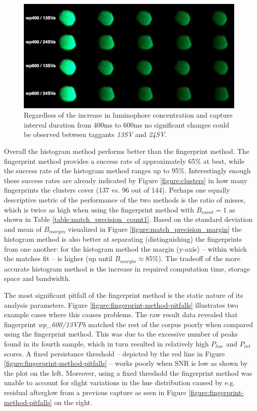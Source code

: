 \documentclass[thesis.tex]{subfiles}
\begin{document}
\begin{figure}[h!]
  \centering \includegraphics[page=1,width=\textwidth]{images/findings/SV}
  \caption{Regardless of the increase in luminophore concentration and capture interval duration from 400ms to 600ms no significant changes could be observed between taggants \emph{13SV} and \emph{24SV}.}
  \label{figure:SV}
\end{figure}

Overall the histogram method performs better than the fingerprint method. The fingerprint method provides a success rate of approximately 65\% at best, while the success rate of the histogram method ranges up to 95\%. Interestingly enough these success rates are already indicated by Figure \ref{figure:clusters} in how many fingerprints the clusters cover (137 vs. 96 out of 144). Perhaps one equally descriptive metric of the performance of the two methods is the ratio of misses, which is twice as high when using the fingerprint method with $B_{count} = 1$ as shown in Table \ref{table:match_precision_count1}. Based on the standard deviation and mean of $B_{margin}$ visualized in Figure \ref{figure:match_precision_margin} the histogram method is also better at separating (distinguishing) the fingerprints from one another: for the histogram method the margin (y-axis) -- within which the matches fit -- is higher (up until $B_{margin} \approx 85\%$). The tradeoff of the more accurate histogram method is the increase in required computation time, storage space and bandwidth.

The most significant pitfall of the fingerprint method is the static nature of its analysis parameters. Figure \ref{figure:fingerprint-method-pitfalls} illustrates two example cases where this causes problems. The raw result data revealed that fingerprint \emph{wp\_600/13VPb} matched the rest of the corpus poorly when compared using the fingerprint method. This was due to the excessive number of peaks found in its fourth sample, which in turn resulted in relatively high $P_{hue}$ and $P_{int}$ scores. A fixed persistance threshold -- depicted by the red line in Figure \ref{figure:fingerprint-method-pitfalls} -- works poorly when SNR is low as shown by the plot on the left. Moreover, using a fixed threshold the fingerprint method was unable to account for slight variations in the hue distribution caused by e.g. residual afterglow from a previous capture as seen in Figure \ref{figure:fingerprint-method-pitfalls} on the right.
\end{document}
